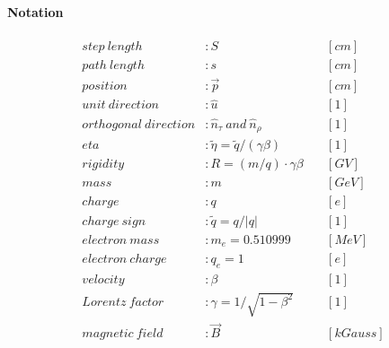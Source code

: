 \documentclass[review]{elsarticle}
\begin{document}
\paragraph{Notation}
\begin{equation} \begin{alignedat}{-1}
    step\ length             &: S                                               \ &&[cm]                                 \\
    path\ length             &: s                                               \ &&[cm]                                 \\
    position                 &: \vec{p}                                         \ &&[cm]                                 \\
    unit\ direction          &: \hat{u}                                         \ &&[1]                                  \\ 
    orthogonal\ direction    &: \hat{n}_{\tau}\ and\ \hat{n}_{\rho}             \ &&[1]                                  \\ 
    eta                      &: \tilde{\eta}=\tilde{q}/\left(\gamma\beta\right) \ &&[1]                                  \\
    rigidity                 &: R=\left(m/q\right)\cdot\gamma\beta              \ &&[GV]                                 \\
    mass                     &: m                                               \ &&[GeV]                                \\
    charge                   &: q                                               \ &&[e]                                  \\
    charge\ sign             &: \tilde{q}=q/\bigl|q\bigr|                       \ &&[1]                                  \\
    electron\ mass           &: m_{e}=0.510999                                  \ &&[MeV]                                \\
    electron\ charge         &: q_{e}=1                                         \ &&[e]                                  \\
    velocity                 &: \beta                                           \ &&[1]                                  \\
    Lorentz\ factor          &: \gamma=1/\sqrt{1-{\beta}^{2}}                   \ &&[1]                                  \\
    magnetic\ field          &: \vec{B}                                         \ &&[kGauss]                             \\

\end{alignedat}
\end{equation}
\end{document}
